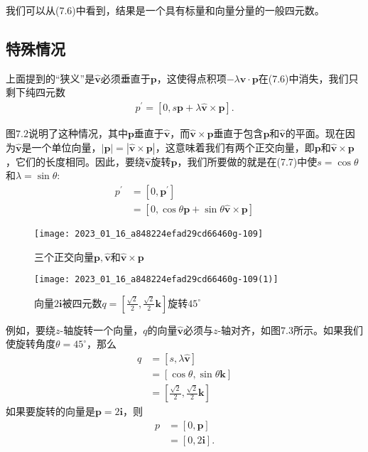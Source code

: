 我们可以从(7.6)中看到，结果是一个具有标量和向量分量的一般四元数。

\subsection{特殊情况}
上面提到的“狭义”是$\hat{\mathbf{v}}$必须垂直于$\mathbf{p}$，这使得点积项$-\lambda \hat{\mathbf{v}} \cdot \mathbf{p}$在(7.6)中消失，我们只剩下纯四元数
\begin{align}
    p^{\prime}=[0, s \mathbf{p}+\lambda \hat{\mathbf{v}} \times \mathbf{p}] .
\end{align}

图$7.2$说明了这种情况，其中$\mathbf{p}$垂直于$\hat{\mathbf{v}}$，而$\hat{\mathbf{v}} \times \mathbf{p}$垂直于包含$\mathbf{p}$和$\hat{\mathbf{v}}$的平面。现在因为$\hat{\mathbf{v}}$是一个单位向量，$|\mathbf{p}|=|\hat{\mathbf{v}} \times\mathbf{p}|$，这意味着我们有两个正交向量，即$\mathbf{p}$和$\hat{\mathbf{v}} \times\mathbf{p}$，它们的长度相同。因此，要绕$\hat{\mathbf{v}}$旋转$\mathbf{p}$，我们所要做的就是在(7.7)中使$s=\cos \theta$和$ \lambda=\sin \theta$:
$$
\begin{aligned}
p^{\prime} & =\left[0, \mathbf{p}^{\prime}\right] \\
& =[0, \cos \theta \mathbf{p}+\sin \theta \hat{\mathbf{v}} \times \mathbf{p}]
\end{aligned}
$$

\begin{figure}[h!]
    \texttt{[image: 2023\_01\_16\_a848224efad29cd66460g-109]}
    \caption[short]{三个正交向量$\mathbf{p}, \hat{\mathbf{v}}$和$\hat{\mathbf{v}} \times \mathbf{p}$}
\end{figure}
\begin{figure}[h!]
    \texttt{[image: 2023\_01\_16\_a848224efad29cd66460g-109(1)]}
    \caption[short]{向量$2 \mathbf{i}$被四元数$q=\left[\frac{\sqrt{2}}{2}, \frac{\sqrt{2}}{2} \mathbf{k}\right]$旋转$45^{\circ}$}
\end{figure}

例如，要绕$z$-轴旋转一个向量，$q$的向量$\hat{\mathbf{v}}$必须与$z$-轴对齐，如图7.3所示。如果我们使旋转角度$\theta=45^{\circ}$，那么
$$
\begin{aligned}
q & =[s, \lambda \hat{\mathbf{v}}] \\
& =[\cos \theta, \sin \theta \mathbf{k}] \\
& =\left[\frac{\sqrt{2}}{2}, \frac{\sqrt{2}}{2} \mathbf{k}\right]
\end{aligned}
$$
如果要旋转的向量是$\mathbf{p}=2 \mathbf{i}$，则
$$
\begin{aligned}
p & =[0, \mathbf{p}] \\
& =[0,2 \mathbf{i}] .
\end{aligned}
$$

